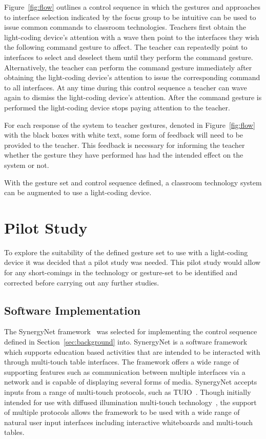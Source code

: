 \documentclass[link]{IWCOMP}
\begin{document}
Figure~\ref{fig:flow} outlines a control sequence in which the gestures and approaches to interface selection indicated by the focus group to be intuitive can be used to issue common commands to classroom technologies.
Teachers first obtain the light-coding device's attention with a wave then point to the interfaces they wish the following command gesture to affect.
The teacher can repeatedly point to interfaces to select and deselect them until they perform the command gesture.
Alternatively, the teacher can perform the command gesture immediately after obtaining the light-coding device's attention to issue the corresponding command to all interfaces.
At any time during this control sequence a teacher can wave again to dismiss the light-coding device's attention.
After the command gesture is performed the light-coding device stops paying attention to the teacher.

For each response of the system to teacher gestures, denoted in Figure~\ref{fig:flow} with the black boxes with white text, some form of feedback will need to be provided to the teacher.
This feedback is necessary for informing the teacher whether the gesture they have performed has had the intended effect on the system or not.

With the gesture set and control sequence defined, a classroom technology system can be augmented to use a light-coding device.

\section{Pilot Study}
\label{sec:pilotStudy}

To explore the suitability of the defined gesture set to use with a light-coding device it was decided that a pilot study was needed.
This pilot study would allow for any short-comings in the technology or gesture-set to be identified and corrected before carrying out any further studies.

\subsection{Software Implementation}
\label{subsec:pilotStudyImplementation}

The SynergyNet framework~\cite{Higgins2011} was selected for implementing the control sequence defined in Section~\ref{sec:background} into.
SynergyNet is a software framework which supports education based activities that are intended to be interacted with through multi-touch table interfaces.
The framework offers a wide range of supporting features such as communication between multiple interfaces via a network and is capable of displaying several forms of media.
SynergyNet accepts inputs from a range of multi-touch protocols, such as TUIO~\cite{Kaltenbrunner2009}.
Though initially intended for use with diffused illumination multi-touch technology~\cite{Matsushita1997}, the support of multiple protocols allows the framework to be used with a wide range of natural user input interfaces including interactive whiteboards and multi-touch tables.
\end{document}

